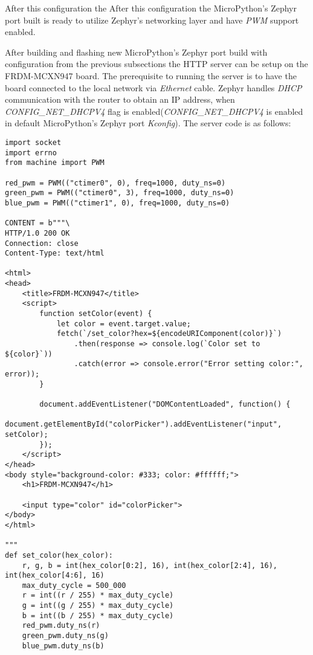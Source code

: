 \documentclass[twoside, 12pt]{article}
\begin{document}
After this configuration the After this configuration the MicroPython's Zephyr port built is ready to utilize Zephyr's networking layer and have \textit{PWM} support enabled.

After building and flashing new MicroPython's Zephyr port build with configuration from the
previous subsections the HTTP server can be setup on the FRDM-MCXN947 board. The 
prerequisite to running the server is to have the board connected to the local network via 
\textit{Ethernet} cable. Zephyr handles \textit{DHCP} communication with the router to 
obtain an IP address, when \textit{CONFIG\_NET\_DHCPV4} flag is 
enabled(\textit{CONFIG\_NET\_DHCPV4} is enabled in default MicroPython's Zephyr port 
\textit{Kconfig}). The server code is as follows:

\begin{lstlisting}[caption={HTTP server implementation with MicroPython for MicroPython's Zehpyr port runing on FRDM-MCXN947 board},breaklines=true]
import socket
import errno
from machine import PWM

red_pwm = PWM(("ctimer0", 0), freq=1000, duty_ns=0)
green_pwm = PWM(("ctimer0", 3), freq=1000, duty_ns=0)
blue_pwm = PWM(("ctimer1", 0), freq=1000, duty_ns=0)

CONTENT = b"""\
HTTP/1.0 200 OK
Connection: close
Content-Type: text/html

<html>
<head>
    <title>FRDM-MCXN947</title>
    <script>
        function setColor(event) {
            let color = event.target.value;
            fetch(`/set_color?hex=${encodeURIComponent(color)}`)
                .then(response => console.log(`Color set to ${color}`))
                .catch(error => console.error("Error setting color:", error));
        }

        document.addEventListener("DOMContentLoaded", function() {
            document.getElementById("colorPicker").addEventListener("input", setColor);
        });
    </script>
</head>
<body style="background-color: #333; color: #ffffff;">
    <h1>FRDM-MCXN947</h1>
    
    <input type="color" id="colorPicker">
</body>
</html>

"""
def set_color(hex_color):
    r, g, b = int(hex_color[0:2], 16), int(hex_color[2:4], 16), int(hex_color[4:6], 16)
    max_duty_cycle = 500_000
    r = int((r / 255) * max_duty_cycle)
    g = int((g / 255) * max_duty_cycle)
    b = int((b / 255) * max_duty_cycle)
    red_pwm.duty_ns(r)
    green_pwm.duty_ns(g)
    blue_pwm.duty_ns(b)


\end{lstlisting}
\end{document}
